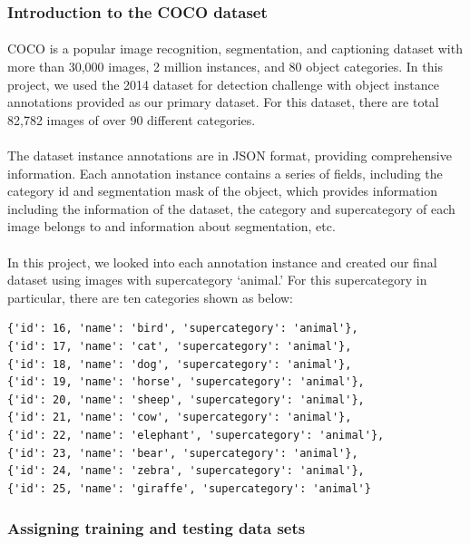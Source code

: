 \documentclass{article}
\begin{document}
\subsubsection{Introduction to the COCO dataset}
\paragraph{}
COCO is a popular image recognition, segmentation, and captioning dataset with more than 30,000 images, 2 million instances, and 80 object categories. In this project, we used the 2014 dataset for detection challenge with object instance annotations provided as our primary dataset. For this dataset, there are total 82,782 images of over 90 different categories.
\paragraph{}
The dataset instance annotations are in JSON format, providing comprehensive information. Each annotation instance contains a series of fields, including the category id and segmentation mask of the object, which provides information including the information of the dataset, the category and supercategory of each image belongs to and information about segmentation, etc.
\paragraph{}
In this project, we looked into each annotation instance and created our final dataset using images with supercategory ‘animal.’ For this supercategory in particular, there are ten categories shown as below:
 
\begin{verbatim}
{'id': 16, 'name': 'bird', 'supercategory': 'animal'},
{'id': 17, 'name': 'cat', 'supercategory': 'animal'},
{'id': 18, 'name': 'dog', 'supercategory': 'animal'},
{'id': 19, 'name': 'horse', 'supercategory': 'animal'},
{'id': 20, 'name': 'sheep', 'supercategory': 'animal'},
{'id': 21, 'name': 'cow', 'supercategory': 'animal'},
{'id': 22, 'name': 'elephant', 'supercategory': 'animal'},
{'id': 23, 'name': 'bear', 'supercategory': 'animal'},
{'id': 24, 'name': 'zebra', 'supercategory': 'animal'},
{'id': 25, 'name': 'giraffe', 'supercategory': 'animal'}
\end{verbatim}
 
\subsubsection{Assigning training and testing data sets}
\end{document}
